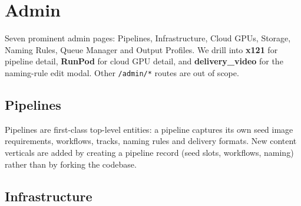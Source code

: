 \chapter{Admin}
\label{ch:admin}

Seven prominent admin pages: Pipelines, Infrastructure, Cloud GPUs, Storage,
Naming Rules, Queue Manager and Output Profiles. We drill into
\textbf{x121} for pipeline detail, \textbf{RunPod} for cloud GPU detail, and
\textbf{delivery\_video} for the naming-rule edit modal. Other
\texttt{/admin/*} routes are out of scope.

\section{Pipelines}
\label{sec:admin-pipelines}

Pipelines are first-class top-level entities: a pipeline captures its own seed
image requirements, workflows, tracks, naming rules and delivery formats. New
content verticals are added by creating a pipeline record (seed slots, workflows,
naming) rather than by forking the codebase.


\begin{itemize}
\end{itemize}


\begin{itemize}
\end{itemize}

\section{Infrastructure}
\label{sec:admin-infrastructure}

